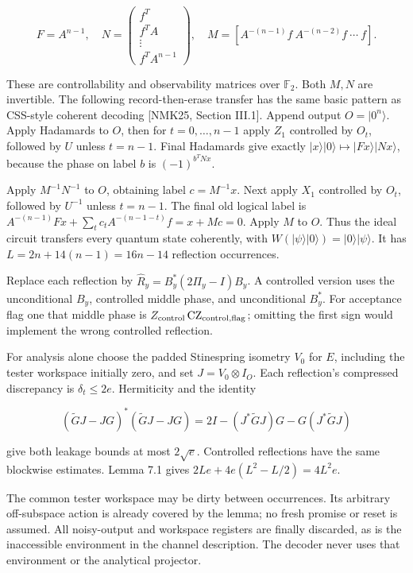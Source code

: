 \documentclass[11pt]{article}
\begin{document}
\[
F=A^{n-1},\quad
N=\begin{pmatrix}f^T\\f^TA\\\vdots\\f^TA^{n-1}\end{pmatrix},\quad
M=[A^{-(n-1)}f\ A^{-(n-2)}f\ \cdots\ f].
\tag{7.3}
\]

These are controllability and observability matrices over \(\mathbb F_2\).
Both \(M,N\) are invertible. The following record-then-erase transfer has
the same basic pattern as CSS-style coherent decoding [NMK25, Section III.1].
Append output \(O=|0^n\rangle\). Apply
Hadamards to \(O\), then for \(t=0,\ldots,n-1\) apply \(Z_1\)
controlled by \(O_t\), followed by \(U\) unless \(t=n-1\). Final
Hadamards give exactly \(|x\rangle|0\rangle\mapsto|Fx\rangle|Nx\rangle\),
because the phase on label \(b\) is \((-1)^{b^TNx}\).

Apply \(M^{-1}N^{-1}\) to \(O\), obtaining label \(c=M^{-1}x\).
Next apply \(X_1\) controlled by \(O_t\), followed by \(U^{-1}\)
unless \(t=n-1\). The final old logical label is
\(A^{-(n-1)}Fx+\sum_tc_tA^{-(n-1-t)}f=x+Mc=0\).
Apply \(M\) to \(O\). Thus the ideal circuit transfers every quantum
state coherently, with \(W(|\psi\rangle|0\rangle)=|0\rangle|\psi\rangle\).
It has \(L=2n+14(n-1)=16n-14\) reflection occurrences.

Replace each reflection by
\(\widehat R_y=B_y^*(2\Pi_y-I)B_y\). A controlled version uses the
unconditional \(B_y\), controlled middle phase, and unconditional
\(B_y^*\). For acceptance flag one that middle phase is
\(Z_{\rm control}\,\mathrm{CZ}_{\rm control,flag}\); omitting the first
sign would implement the wrong controlled reflection.

For analysis alone choose the padded Stinespring isometry \(V_0\) for
\(E\), including the tester workspace initially zero, and set
\(J=V_0\otimes I_O\). Each reflection's compressed discrepancy is
\(\delta_t\le2e\). Hermiticity and the identity

\[
(\widetilde GJ-JG)^*(\widetilde GJ-JG)
=2I-(J^*\widetilde GJ)G-G(J^*\widetilde GJ)
\]

give both leakage bounds at most \(2\sqrt e\). Controlled reflections
have the same blockwise estimates. Lemma 7.1 gives
\(2Le+4e(L^2-L/2)=4L^2e\).

The common tester workspace may be dirty between occurrences. Its arbitrary
off-subspace action is already covered by the lemma; no fresh promise or
reset is assumed. All noisy-output and workspace registers are finally
discarded, as is the inaccessible environment in the channel description.
The decoder never uses that environment or the analytical projector.
\end{document}
